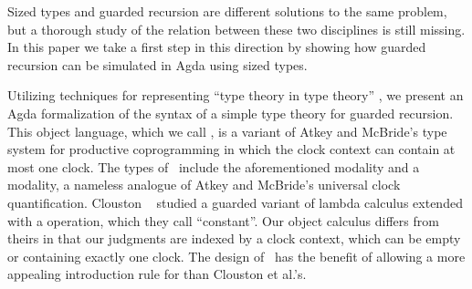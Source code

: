 



Sized types and guarded recursion are different solutions to the same
problem, but a thorough study of the relation between these two
disciplines is still missing. In this paper we take a first step in
this direction by showing how guarded recursion can be simulated in
Agda using sized types. 

Utilizing techniques for representing ``type theory in type theory''
\cite{AltenkirchK16,Chapman09}, we present an Agda formalization of
the syntax of a simple type theory for guarded recursion. This object
language, which we call \GTT, is a variant of Atkey and McBride's type
system for productive coprogramming \cite{atkey2013productive} in
which the clock context can contain at most one clock. The types of
\GTT\ include the aforementioned  modality and a  modality,
a nameless analogue of Atkey and McBride's universal clock
quantification. Clouston \etal \ \cite{CloustonBGB15} studied a
guarded variant of lambda calculus extended with a  operation,
which they call ``constant''.  Our object calculus differs from
theirs in that our judgments are indexed by a clock context, which can
be empty or containing exactly one clock. 
The design of \GTT\ has the benefit of allowing a more appealing introduction rule for
 than Clouston et al.'s.


